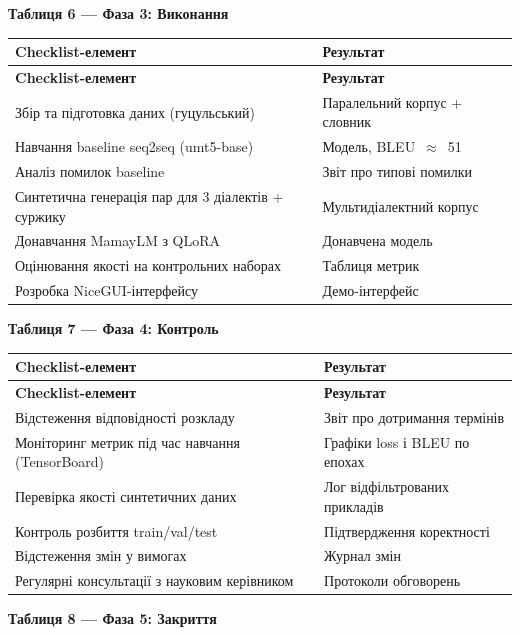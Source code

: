 \documentclass[14pt]{extarticle}
\newcommand{\tabhead}[1]{\textbf{#1}}
\begin{document}
\vspace{4pt}
\noindent\textbf{Таблиця 6 --- Фаза 3: Виконання}

\begin{longtable}{|p{}|p{}|}
\hline
\tabhead{Checklist-елемент} & \tabhead{Результат} \\
\hline
\endfirsthead
\hline
\tabhead{Checklist-елемент} & \tabhead{Результат} \\
\hline
\endhead
Збір та підготовка даних (гуцульський) & Паралельний корпус + словник \\
\hline
Навчання baseline seq2seq (umt5-base) & Модель, BLEU~$\approx$~51 \\
\hline
Аналіз помилок baseline & Звіт про типові помилки \\
\hline
Синтетична генерація пар для 3 діалектів + суржику & Мульти\-діалектний корпус \\
\hline
Донавчання MamayLM з QLoRA & Донавчена модель \\
\hline
Оцінювання якості на контрольних наборах & Таблиця метрик \\
\hline
Розробка NiceGUI-інтерфейсу & Демо-інтерфейс \\
\hline
\end{longtable}

\vspace{4pt}
\noindent\textbf{Таблиця 7 --- Фаза 4: Контроль}

\begin{longtable}{|p{}|p{}|}
\hline
\tabhead{Checklist-елемент} & \tabhead{Результат} \\
\hline
\endfirsthead
\hline
\tabhead{Checklist-елемент} & \tabhead{Результат} \\
\hline
\endhead
Відстеження відповідності розкладу & Звіт про дотримання термінів \\
\hline
Моніторинг метрик під час навчання (TensorBoard) & Графіки loss і BLEU по епохах \\
\hline
Перевірка якості синтетичних даних & Лог відфільтрованих прикладів \\
\hline
Контроль розбиття train/val/test & Підтвердження коректності \\
\hline
Відстеження змін у вимогах & Журнал змін \\
\hline
Регулярні консультації з науковим керівником & Протоколи обговорень \\
\hline
\end{longtable}

\vspace{4pt}
\noindent\textbf{Таблиця 8 --- Фаза 5: Закриття}
\end{document}
